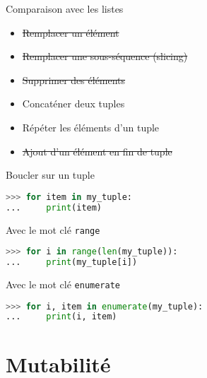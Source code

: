 \begin{frame}{Comparaison avec les listes}

  \begin{itemize}
    \item \sout{Remplacer un élément}
    \item \sout{Remplacer une sous-séquence (slicing)}
    \item \sout{Supprimer des éléments}
    \item Concaténer deux tuples
    \item Répéter les éléments d'un tuple
    \item \sout{Ajout d'un élément en fin de tuple}
  \end{itemize}
  
\end{frame}


\begin{frame}[fragile]{Boucler sur un tuple}


\begin{lstlisting}[language=Python, morekeywords={True, false}, numbers=none]
>>> for item in my_tuple:
...     print(item)
\end{lstlisting}
    
Avec le mot clé \texttt{range}
\begin{lstlisting}[language=Python, morekeywords={True, false}, numbers=none]
>>> for i in range(len(my_tuple)):
...     print(my_tuple[i])
\end{lstlisting}
    
Avec le mot clé \texttt{enumerate}
\begin{lstlisting}[language=Python, morekeywords={True, false}, numbers=none]
>>> for i, item in enumerate(my_tuple):
...     print(i, item)
\end{lstlisting}
\end{frame}


\section{Mutabilité}


